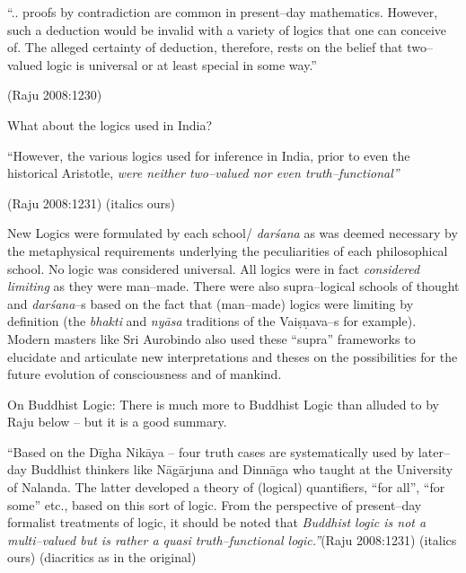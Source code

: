 \begin{myquote}
“.. proofs by contradiction are common in present–day mathematics. However, such a deduction would be invalid with a variety of logics that one can conceive of. The alleged certainty of deduction, therefore, rests on the belief that two–valued logic is universal or at least special in some way.”
\end{myquote}

\hfill (Raju 2008:1230)

What about the logics used in India?

\begin{myquote}
“However, the various logics used for inference in India, prior to even the historical Aristotle, \textit{were neither two–valued nor even\general{\break } truth–functional”}
\end{myquote}

\hfill (Raju 2008:1231) (italics ours)

New Logics were formulated by each school/ \textit{darśana} as was deemed necessary by the metaphysical requirements underlying the peculiarities of each philosophical school. No logic was considered universal. All logics were in fact \textit{considered limiting} as they were man–made. There were also supra–logical schools of thought and \textit{darśana}–s based on the fact that (man–made) logics were limiting by definition (the \textit{bhakti} and \textit{nyāsa} traditions of the Vaiṣṇava–s for example). Modern masters like Sri Aurobindo also used these “supra” frameworks to elucidate and articulate new interpretations and theses on the possibilities for the future evolution of consciousness and of mankind.

On Buddhist Logic:  There is much more to Buddhist Logic than alluded to by Raju below – but it is a good summary.

\begin{myquote}
“Based on the Dīgha Nikāya – four truth cases are systematically used by later–day Buddhist thinkers like Nāgārjuna and Dinnāga who taught at the University of Nalanda. The latter developed a theory of (logical) quantifiers, “for all”, “for some” etc., based on this sort of logic. From the perspective of present–day formalist treatments of logic, it should be noted that \textit{Buddhist logic is not a multi–valued but is rather a quasi truth–functional logic.”}\hfill (Raju 2008:1231) (italics ours) (diacritics as in the original)
\end{myquote}

